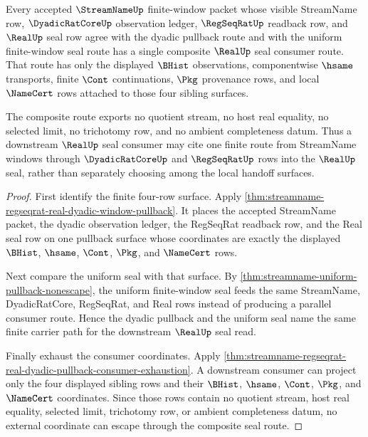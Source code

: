 \begin{theorem}
\label{thm:streamname-regseqrat-real-route-transitivity}
Every accepted $\StreamNameUp$ finite-window packet whose visible StreamName
row, $\DyadicRatCoreUp$ observation ledger, $\RegSeqRatUp$ readback row, and
$\RealUp$ seal row agree with the dyadic pullback route and with the uniform
finite-window seal route has a single composite $\RealUp$ seal consumer route.
That route has only the displayed $\BHist$ observations, componentwise
$\hsame$ transports, finite $\Cont$ continuations, $\Pkg$ provenance rows, and
local $\NameCert$ rows attached to those four sibling surfaces.

The composite route exports no quotient stream, no host real equality, no
selected limit, no trichotomy row, and no ambient completeness datum. Thus a
downstream $\RealUp$ seal consumer may cite one finite route from StreamName
windows through $\DyadicRatCoreUp$ and $\RegSeqRatUp$ rows into the $\RealUp$
seal, rather than separately choosing among the local handoff surfaces.
\end{theorem}
\begin{proof}
First identify the finite four-row surface. Apply
\autoref{thm:streamname-regseqrat-real-dyadic-window-pullback}. It places the
accepted StreamName packet, the dyadic observation ledger, the RegSeqRat
readback row, and the Real seal row on one pullback surface whose coordinates
are exactly the displayed $\BHist$, $\hsame$, $\Cont$, $\Pkg$, and
$\NameCert$ rows.

Next compare the uniform seal with that surface. By
\autoref{thm:streamname-uniform-pullback-nonescape}, the uniform
finite-window seal feeds the same StreamName, DyadicRatCore, RegSeqRat, and
Real rows instead of producing a parallel consumer route. Hence the dyadic
pullback and the uniform seal name the same finite carrier path for the
downstream $\RealUp$ seal read.

Finally exhaust the consumer coordinates. Apply
\autoref{thm:streamname-regseqrat-real-dyadic-pullback-consumer-exhaustion}.
A downstream consumer can project only the four displayed sibling rows and
their $\BHist$, $\hsame$, $\Cont$, $\Pkg$, and $\NameCert$ coordinates. Since
those rows contain no quotient stream, host real equality, selected limit,
trichotomy row, or ambient completeness datum, no external coordinate can
escape through the composite seal route.
\end{proof}

